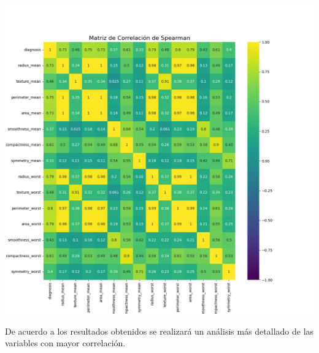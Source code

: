 \documentclass[a4paper, 12pt]{article}
\begin{document}
	\includegraphics[width = \textwidth]{../Plots/plots_corr/corr_matrix/matriz_correlacion_spearman.png}

	De acuerdo a los resultados obtenidos se realizará un análisis más detallado de las variables con mayor correlación.
\end{document}

